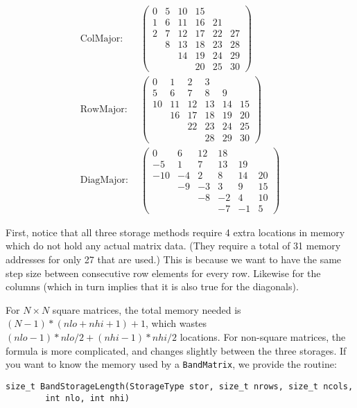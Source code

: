 \documentclass[twoside,letterpaper,11pt]{article}
\renewcommand{\tt}[1]{{\texttt {#1}}}
\begin{document}
\begin{align*}
\textrm{ColMajor:} ~ ~ & \left(\begin{array}{cccccc}0 & 5 & 10 & 15 &  &  \\1 & 6 & 11 & 16 & 21 &  \\2 & 7 & 12 & 17 & 22 & 27 \\ & 8 & 13 & 18 & 23 & 28 \\ &  & 14 & 19 & 24 & 29 \\ &  &  & 20 & 25 & 30\end{array}\right) \\
\textrm{RowMajor:} ~  ~ & \left(\begin{array}{cccccc}0 & 1 & 2 & 3 &  &  \\ 5 & 6 & 7 & 8 & 9 &  \\ 10 & 11 & 12 & 13 & 14 & 15 \\ & 16 & 17 & 18 & 19 & 20 \\ &  & 22 & 23 & 24 & 25 \\ &  &  & 28 & 29 & 30\end{array}\right) \\
\textrm{DiagMajor:} ~  ~ & \left(\begin{array}{cccccc}0 & 6 & 12 & 18 &  &  \\-5 & 1 & 7 & 13 & 19 &  \\ -10 & -4 & 2 & 8 & 14 & 20 \\ & -9 & -3 & 3 & 9 & 15 \\ &  & -8 & -2 & 4 & 10 \\ &  &  & -7 & -1 & 5\end{array}\right)
\end{align*}

First, notice that all three storage methods require 4 extra locations in memory 
which do not hold
any actual matrix data.  
(They require a total of 31 memory addresses for only 27 that are used.)
This is because we want to have the same step size between consecutive row elements
for every row.  Likewise for the columns (which in turn implies that it is also 
true for the diagonals).

For $N\times N$ square matrices, the total memory needed is $(N-1)*(nlo+nhi+1)+1$, 
which wastes $(nlo-1)*nlo/2 + (nhi-1)*nhi/2$ locations.  For non-square
matrices, the formula is more complicated, and changes slightly between the 
three storages.
If you want to know the memory used by a \tt{BandMatrix}, we provide the routine:
\begin{verbatim}
size_t BandStorageLength(StorageType stor, size_t nrows, size_t ncols, 
        int nlo, int nhi)
\end{verbatim}
  
\end{document}
